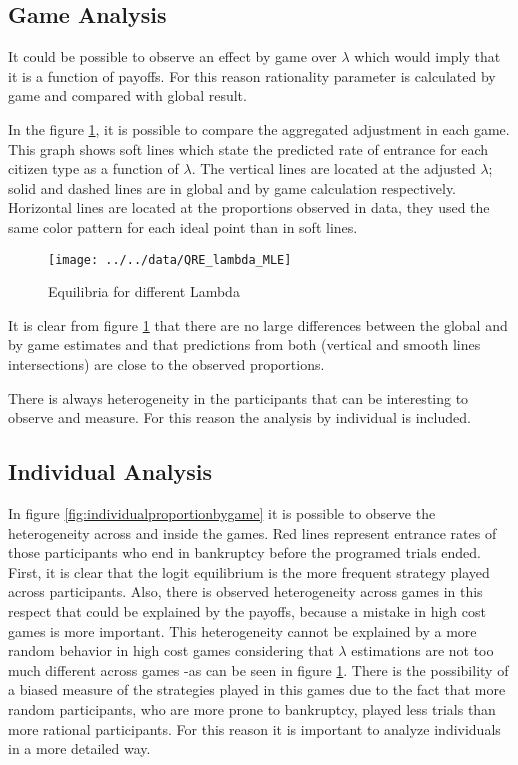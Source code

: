 \subsection{Game Analysis}

It could be possible to observe an effect by game over $\lambda$ which would imply that it is a function of payoffs. For this reason rationality parameter is calculated by game and compared with global result.

In the figure \ref{fig:qrelambdamle}, it is possible to compare the aggregated adjustment in each game. This graph shows soft lines which state the predicted rate of entrance for each citizen type as a function of $\lambda$. The vertical lines are located at the adjusted $\lambda$; solid and dashed lines are in global and by game calculation respectively. Horizontal lines are located at the proportions observed in data, they used the same color pattern for each ideal point than in soft lines. 

\begin{figure}
	\centering
	\texttt{[image: ../../data/QRE\_lambda\_MLE]}
	\caption[QRE]{Equilibria for different Lambda}
	\label{fig:qrelambdamle}
\end{figure}

It is clear from figure \ref{fig:qrelambdamle} that there are no large differences between the global and by game estimates and that predictions from both (vertical and smooth lines intersections) are close to the observed proportions.

There is always heterogeneity in the participants that can be interesting to observe and measure. For this reason the analysis by individual is included.

\subsection{Individual Analysis}

In figure \ref{fig:individualproportionbygame} it is possible to observe the heterogeneity across and inside the games. 
Red lines represent entrance rates of those participants who end in bankruptcy before the programed trials ended. First, it is clear that the logit equilibrium is the more frequent strategy played across participants.
Also, there is observed heterogeneity across games in this respect that could be explained by the payoffs, because a mistake in high cost games is more important. 
This heterogeneity cannot be explained by a more random behavior in high cost games considering that $\lambda$ estimations are not too much different across games -as can be seen in figure \ref{fig:qrelambdamle}. There is the possibility of a biased measure of the strategies played in this games due to the fact that more  random participants, who are more prone to bankruptcy, played less trials than more rational participants. For this reason it is important to analyze individuals in a more detailed way. 


